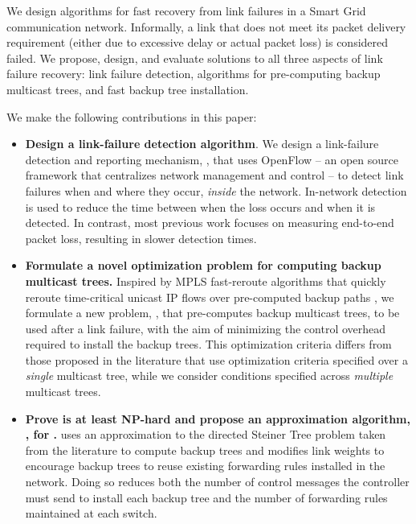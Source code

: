 We design algorithms for fast recovery from link failures in a Smart Grid communication network. 
Informally, a link that does not meet its packet delivery requirement (either due to excessive delay or actual packet loss) is considered failed. 
We propose, design, and evaluate solutions to all three aspects of link failure recovery: link failure detection, algorithms for pre-computing backup multicast trees, 
and fast backup tree installation. 

We make the following contributions in this paper: 
\begin{itemize}

	\item {\bf Design a link-failure detection algorithm}. 
	We design a link-failure detection and reporting mechanism, \pcnts, that uses OpenFlow \cite{OpenFlow08} -- an open source framework 
	that centralizes network management and control -- to detect link failures when and where they occur, \emph{inside} the network.  In-network detection is used to reduce the 
	time between when the loss occurs and when it is detected. In contrast, most previous work \cite{Almes99,Caceres99,Friedl09} focuses on measuring end-to-end packet loss, 
	resulting in slower detection times. 


	\item {\bf Formulate a novel optimization problem for computing backup multicast trees.} 
	Inspired by MPLS fast-reroute algorithms that quickly reroute time-critical unicast IP flows over pre-computed backup paths \cite{Rosen01}, 
	we formulate a new problem, \mcs, that pre-computes backup multicast trees, to be used after a link failure, with the aim 
	of minimizing the control overhead required to install the backup trees. 
	 This optimization criteria differs from those proposed in the literature \cite{Cui04,Fei01,Medard99,Pointurier02,Wu97} that use optimization
 	criteria specified over a \emph{single} multicast tree, while we consider conditions specified across \emph{multiple} multicast trees. 

	\item {\bf Prove \mc is at least NP-hard and propose an approximation algorithm, \steiners, for \mcs.} 
	\steiner uses an approximation to the directed Steiner Tree problem taken from the literature \cite{Charikar98} to compute backup trees and modifies link weights to 
	encourage backup trees to reuse existing forwarding rules installed in the network. Doing so reduces both the number of control messages the controller must send to install each backup tree
	and the number of forwarding rules maintained at each switch.


\end{itemize}
